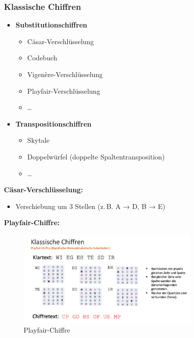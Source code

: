 \documentclass[a4paper,12pt]{article}
\begin{document}
\subsubsection{Klassische Chiffren}
\begin{itemize}
    \item \textbf{Substitutionschiffren}
    \begin{itemize}
        \item Cäsar-Verschlüsselung
        \item Codebuch
        \item Vigenère-Verschlüsselung
        \item Playfair-Verschlüsselung
        \item \dots
    \end{itemize}
    \item \textbf{Transpositionschiffren}
    \begin{itemize}
        \item Skytale
        \item Doppelwürfel (doppelte Spaltentransposition)
        \item \dots
    \end{itemize}
\end{itemize}

\vspace{1em}
\noindent\textbf{Cäsar-Verschlüsselung:}
\begin{itemize}
    \item Verschiebung um 3 Stellen (z. B. A → D, B → E)
\end{itemize}

\vspace{1em}
\noindent\textbf{Playfair-Chiffre:}
\begin{figure}[H]
    \centering
    \includegraphics[width=0.8\textwidth]{bilder/playfair.png}
    \caption{Playfair-Chiffre}
    \label{fig:playfair}
\end{figure}
\end{document}
